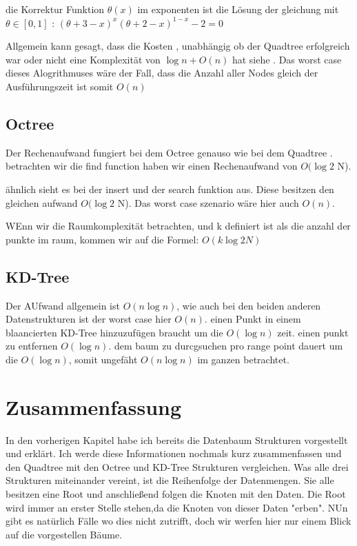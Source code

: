 \documentclass[11pt]{article}
\newcommand{\qt}{Quadtree }
\newcommand{\oc}{Octree }
\newcommand{\kd}{KD-Tree }
\begin{document}
die Korrektur Funktion $\theta(x)$ im exponenten ist die Lösung der gleichung mit $\theta \in [0,1]$ : 
$(\theta + 3 -x)^x(\theta + 2 - x)^{1-x} -2 = 0$

Allgemein kann gesagt, dass die Kosten , unabhängig ob der \qt erfolgreich war oder nicht eine Komplexität von $\log n + O(n)$ hat siehe \cite[S.475ff]{quadtree} .
Das worst case dieses Alogrithmuses wäre der Fall, dass die Anzahl aller Nodes gleich der Ausführungszeit ist somit $O(n)$

\subsection{\oc}

Der Rechenaufwand fungiert bei dem \oc genauso wie bei dem \qt . 
betrachten wir die find function haben wir einen Rechenaufwand von $O(\log2 $ N). 

ähnlich sieht es bei der insert und der search funktion aus. Diese besitzen den gleichen aufwand  $O(\log2 $ N).
Das worst case szenario wäre hier auch $O(n)$. 

WEnn wir die Raumkomplexität betrachten, und k definiert ist als die anzahl der punkte im raum, kommen wir auf die Formel: $O(k \log2 N) $ 


\subsection{\kd}

Der AUfwand allgemein ist $O(n \log n)$, wie auch bei den beiden anderen Datenstrukturen ist der worst case hier $O(n)$. 
einen Punkt in einem blaancierten \kd hinzuzufügen braucht um die $O(\log n)$ zeit. einen punkt zu entfernen $O(\log n)$. 
dem baum zu durcgsuchen pro range point dauert um die $O(\log n)$, somit ungefäht $O(n \log n)$ im ganzen betrachtet. 

\pagebreak

\section{Zusammenfassung}
In den vorherigen Kapitel habe ich bereits die Datenbaum Strukturen vorgestellt und erklärt. Ich werde diese Informationen nochmals kurz zusammenfassen und den \qt mit den \oc und \kd Strukturen vergleichen. 
\newline    
Was alle drei Strukturen miteinander vereint, ist die Reihenfolge der Datenmengen. Sie alle besitzen eine Root und anschließend folgen die Knoten mit den Daten. Die Root wird immer an erster Stelle stehen,da die Knoten von dieser Daten "erben". NUn gibt es natürlich Fälle wo dies nicht zutrifft, doch wir werfen hier nur einem Blick auf die vorgestellen Bäume. 
\end{document}
